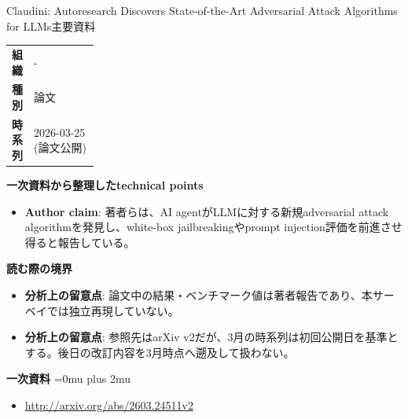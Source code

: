 \begin{technicalnote}{Claudini: Autoresearch Discovers State-of-the-Art Adversarial Attack Algorithms for LLMs}{主要資料}
\begingroup
\begin{tabularx}{\linewidth}{@{}>{\bfseries}p{0.22\linewidth}X@{}}
組織 & - \\
種別 & 論文 \\
時系列 & 2026-03-25 (論文公開) \\
\end{tabularx}
\smallskip
{\bfseries 一次資料から整理したtechnical points}
\begin{itemize}[leftmargin=1.5em,itemsep=0.35em]
\item \textbf{Author claim}: 著者らは、AI agentがLLMに対する新規adversarial attack algorithmを発見し、white-box jailbreakingやprompt injection評価を前進させ得ると報告している。
\end{itemize}
\begin{minipage}{\linewidth}
{\bfseries 読む際の境界}
\begin{itemize}[leftmargin=1.5em,itemsep=0.35em]
\item \textbf{分析上の留意点}: 論文中の結果・ベンチマーク値は著者報告であり、本サーベイでは独立再現していない。
\item \textbf{分析上の留意点}: 参照先はarXiv v2だが、3月の時系列は初回公開日を基準とする。後日の改訂内容を3月時点へ遡及して扱わない。
\end{itemize}
\begin{samepage}
{\bfseries 一次資料}
\begingroup\sloppy
\Urlmuskip=0mu plus 2mu\relax
\begin{itemize}[leftmargin=1.5em,itemsep=0.25em]
\item {\scriptsize\url{http://arxiv.org/abs/2603.24511v2}}
\end{itemize}
\endgroup
\end{samepage}
\end{minipage}
\endgroup
\end{technicalnote}
\medskip

